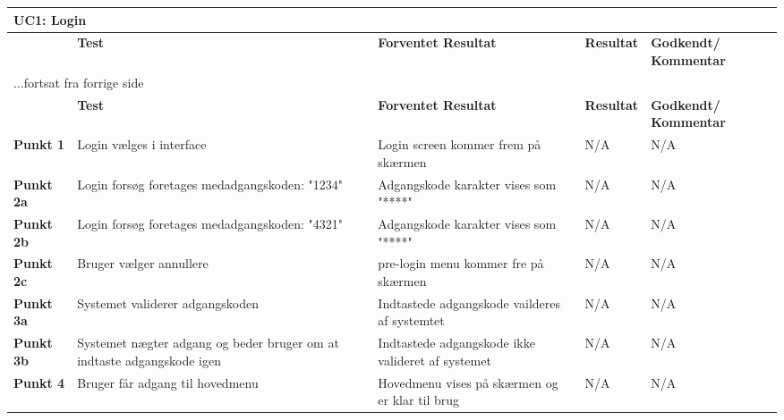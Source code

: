 
\begin{center}
\begin{longtable}{|p{}|p{}|p{3cm}|p{3cm}|p{3cm}|} %
\hline
\multicolumn{5}{|l|}{\textbf{UC1: Login}} \\ \hline
\multicolumn{1}{|c|}{} &
\textbf{Test} &
\textbf{Forventet \newline Resultat} &
\textbf{Resultat} &
\textbf{Godkendt/ \newline Kommentar} \\ \hline 
\endfirsthead

\multicolumn{5}{l}{...fortsat fra forrige side} \\ \hline 
\multicolumn{1}{|c|}{} &
\textbf{Test} &
\textbf{Forventet \newline Resultat} &
\textbf{Resultat} &
\textbf{Godkendt/ \newline Kommentar} \\ \hline 
\endhead


\textbf{Punkt 1}		
&Login vælges i interface	
&Login screen kommer frem på skærmen 	
&N/A 	
&N/A \\\hline
\textbf{Punkt 2a}		
&Login forsøg foretages medadgangskoden: "1234"	
&Adgangskode karakter vises som "****" 	
&N/A 	
&N/A \\\hline
\textbf{Punkt 2b}		
&Login forsøg foretages medadgangskoden: "4321"	
&Adgangskode karakter vises som "****" 	
&N/A 	
&N/A \\\hline
\textbf{Punkt 2c}		
&Bruger vælger annullere	
&pre-login menu kommer fre på skærmen 	
&N/A 	
&N/A \\\hline

\textbf{Punkt 3a}		
&Systemet validerer adgangskoden		
&Indtastede adgangskode vailderes af systemtet 	
&N/A 	
&N/A \\\hline
\textbf{Punkt 3b}		
&Systemet nægter adgang og beder bruger om at indtaste adgangskode igen	
&Indtastede adgangskode ikke valideret af systemet	
&N/A 	
&N/A \\\hline
\textbf{Punkt 4}		
&Bruger får adgang til hovedmenu		
&Hovedmenu vises på skærmen og er klar til brug 	
&N/A 	
&N/A  \\\hline
	\end{longtable}
	\label{ATUC1} 
\end{center}